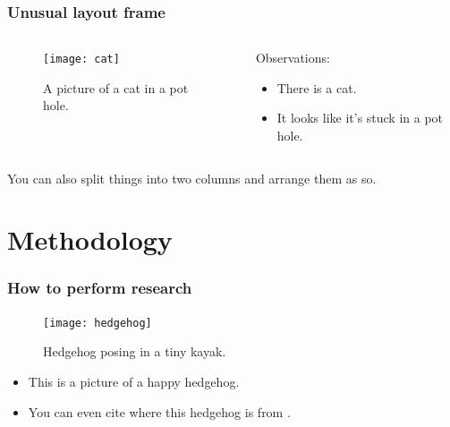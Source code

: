 \documentclass[notes, 10pt,xcolor=table]{beamer}
\begin{document}


\begin{frame}
  \frametitle{Unusual layout frame}
  \begin{columns}
    \begin{column}{.44\textwidth}
      \begin{figure}[t]
        \texttt{[image: cat]}
        \caption{A picture of a cat in a pot hole\footnotemark[1].}
      \end{figure}
    \end{column}
    \begin{column}{.60\textwidth}
      Observations:
        \begin{itemize}
        \item There is a cat.
        \item It looks like it's stuck in a pot hole.
        \end{itemize}
    \end{column}
  \end{columns}

  You can also split things into two columns and arrange them as so.
  
  \vspace{0.8cm}
\end{frame}

\section{Methodology}
\begin{frame}
  \frametitle{How to perform research}
  \begin{figure}
    \texttt{[image: hedgehog]}
    \caption{Hedgehog posing in a tiny kayak.}
  \end{figure}
  \vspace{-0.4cm}
  \begin{itemize}
  \item This is a picture of a happy hedgehog.
  \item You can even cite where this hedgehog is from .
  \end{itemize}
  \vspace{0.15cm}
\end{frame}
\end{document}
